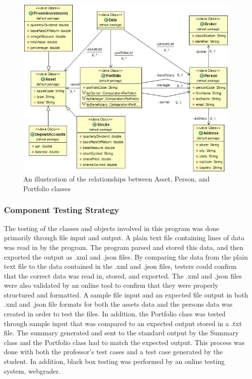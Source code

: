 \documentclass[12pt]{scrartcl} %
\begin{document}
    \graphicspath{{Z:/Design Document/}}
    \begin{figure}[!ht]
        \centering
        \includegraphics[scale=0.7]{entities.jpg}
        \caption{An illustration of the relationships between Asset, Person, and Portfolio classes}
        \label{Figure 2:  Classes and Entities}
    \end{figure}

    \subsubsection{Component Testing Strategy}

    The testing of the classes and objects involved in this program was done primarily through file input and output.  A plain text file containing lines of data was read in by the program.  The program parsed and stored this data, and then exported the output as .xml and .json files.  By comparing the data from the plain text file to the data contained in the .xml and .json files, testers could confirm that the correct data was read in, stored, and exported.  The .xml and .json files were also validated by an online tool to confirm that they were properly structured and formatted.  A sample file input and an expected file output in both .xml and .json file formats for both the assets data and the persons data was created in order to test the files.  In addition, the Portfolio class was tested through sample input that was compared to an expected output stored in a .txt file.  The summary generated and sent to the standard output by the Summary class and the Portfolio class had to match the expected output.  This process was done with both the professor's test cases and a test case generated by the student.  In addition, black box testing was performed by an online testing system, webgrader.
\end{document}

